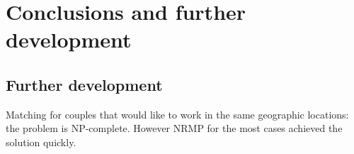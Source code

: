 \def\baselinestretch{1}
\chapter{Conclusions and further development}
\ifpdf
    \graphicspath{{Conclusions/ConclusionsFigs/PNG/}{Conclusions/ConclusionsFigs/PDF/}{Conclusions/ConclusionsFigs/}}
\else
    \graphicspath{{Conclusions/ConclusionsFigs/EPS/}{Conclusions/ConclusionsFigs/}}
\fi

\def\baselinestretch{1.66}

\section{Further development}
Matching for couples that would like to work in the same geographic locations: the problem is NP-complete. However NRMP for the most cases achieved the solution quickly.



